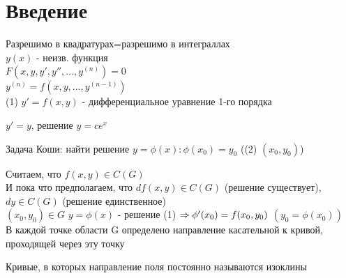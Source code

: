 \documentclass[12pt, fleqn]{article}
\begin{document}
    
    \section{Введение}
    Разрешимо в квадратурах=разрешимо в интеграллах\\
    $y(x)$ - неизв. функция\\
    $F(x,y,y',y'',...,y^{(n)})=0$\\
    $y^{(n)}=f(x,y,...,y^{(n-1)})$\\
    (1) $y'=f(x,y)$ - дифференциальное уравнение 1-го порядка

    \begin{example}
        $y'=y$, решение $y=c e^x$
    \end{example}

    \begin{definition}
        Задача Коши: найти решение $y=\phi(x): \phi(x_0)=y_0$ ((2) $(x_0,y_0)$)
    \end{definition}

    Считаем, что $f(x,y) \in C(G)$\\
    И пока что предполагаем, что $d f(x,y) \in C(G)$ (решение существует), $dy \in C(G)$ (решение единственное)\\
    $(x_0,y_0) \in G$ $y=\phi(x)$ - решение (1) $\Rightarrow \phi'(x_0)=f(x_0,y_0)$ $(y_0=\phi(x_0))$\\
    В каждой точке области G определено направление касательной к кривой, проходящей через эту точку\\
    \begin{definition}
        Кривые, в которых направление поля постоянно называются изоклины
    \end{definition}
\end{document}
